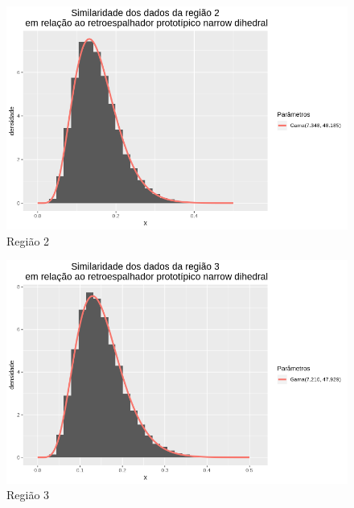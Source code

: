 \documentclass[12pt]{article}
\begin{document}
\begin{figure}[!h]
    \centering
    \includegraphics[width = \linewidth]{../../Images/Report_18_12_20/nd_region2.png}
    \caption{Região 2}
    \label{fig:nd_r2}
\end{figure}

\begin{figure}[!h]
    \centering
    \vspace{0.1\linewidth}
    \includegraphics[width = \linewidth]{../../Images/Report_18_12_20/nd_region3.png}
    \caption{Região 3}
    \label{fig:nd_r3}
\end{figure}
\end{document}
